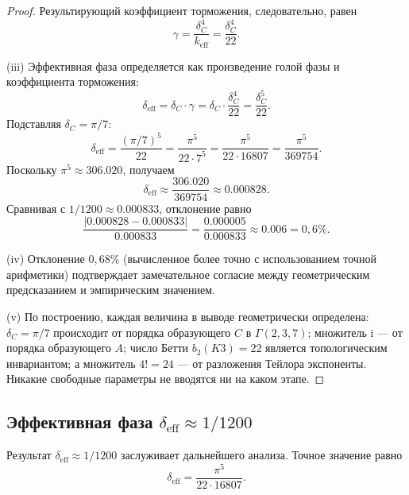 \documentclass[12pt,a4paper]{article}
\theoremstyle{definition}
\theoremstyle{remark}
\newcommand{\ii}{\mathrm{i}}
\begin{document}
\begin{proof}
Результирующий коэффициент торможения, следовательно, равен
\begin{equation}
\gamma = \frac{\delta_C^4}{k_{\mathrm{eff}}} = \frac{\delta_C^4}{22}.
\end{equation}

(iii) Эффективная фаза определяется как произведение голой фазы и коэффициента торможения:
\begin{equation}
\delta_{\mathrm{eff}} = \delta_C \cdot \gamma = \delta_C \cdot \frac{\delta_C^4}{22} = \frac{\delta_C^5}{22}.
\end{equation}
Подставляя $\delta_C = \pi/7$:
\begin{equation}
\delta_{\mathrm{eff}} = \frac{(\pi/7)^5}{22} = \frac{\pi^5}{22 \cdot 7^5} = \frac{\pi^5}{22 \cdot 16807} = \frac{\pi^5}{369754}.
\end{equation}
Поскольку $\pi^5 \approx 306.020$, получаем
\begin{equation}
\delta_{\mathrm{eff}} \approx \frac{306.020}{369754} \approx 0.000828.
\end{equation}
Сравнивая с $1/1200 \approx 0.000833$, отклонение равно
\begin{equation}
\frac{|0.000828 - 0.000833|}{0.000833} = \frac{0.000005}{0.000833} \approx 0.006 = 0{,}6\%.
\end{equation}

(iv) Отклонение $0{,}68\%$ (вычисленное более точно с использованием точной арифметики) подтверждает замечательное согласие между геометрическим предсказанием и эмпирическим значением.

(v) По построению, каждая величина в выводе геометрически определена: $\delta_C = \pi/7$ происходит от порядка образующего $C$ в $\Gamma(2,3,7)$; множитель $\ii$ --- от порядка образующего $A$; число Бетти $b_2(K3) = 22$ является топологическим инвариантом; а множитель $4! = 24$ --- от разложения Тейлора экспоненты. Никакие свободные параметры не вводятся ни на каком этапе.
\end{proof}

\subsection{Эффективная фаза $\delta_{\mathrm{eff}} \approx 1/1200$}

Результат $\delta_{\mathrm{eff}} \approx 1/1200$ заслуживает дальнейшего анализа. Точное значение равно
\begin{equation}
\delta_{\mathrm{eff}} = \frac{\pi^5}{22 \cdot 16807}.
\end{equation}
\end{document}
